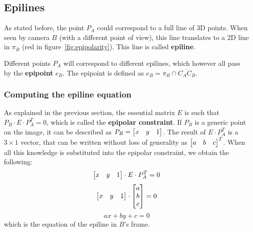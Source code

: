 \subsection{Epilines}

As stated before, the point $P_A$ could correspond to a full line of 3D points.
When seen by camera $B$ (with a different point of view), this line translates to a 2D line in $\pi_B$ (red in figure~\ref{fig:epipolarity}).
This line is called \textbf{epiline}.

Different points $P_A$ will correspond to different epilines, which however all pass by the \textbf{epipoint} $e_B$.
The epipoint is defined as $e_B = \pi_B \cap \overline{C_AC_B}$.

\subsubsection{Computing the epiline equation}

As explained in the previous section, the essential matrix $E$ is such that $P_B \cdot E \cdot P_A^T = 0$, which is called the \textbf{epipolar constraint}.
If $P_B$ is a generic point on the image, it can be described as $P_B = \begin{bmatrix} x & y & 1 \end{bmatrix}$.
The result of $E \cdot P_A^T$ is a $3\times 1$ vector, that can be written without loss of generality as $\begin{bmatrix} a & b & c \end{bmatrix}^T$.
When all this knowledge is substituted into the epipolar constraint, we obtain the following:
\begin{equation}
	\begin{bmatrix} x & y & 1 \end{bmatrix} \cdot E \cdot P_A^T = 0\\
\end{equation}
\begin{equation}
	\begin{bmatrix} x & y & 1 \end{bmatrix} \cdot \begin{bmatrix} a \\ b \\ c \end{bmatrix} = 0\\
\end{equation}
\begin{equation}
	ax + by + c = 0
\end{equation}
which is the equation of the epiline in $B$'s frame.
